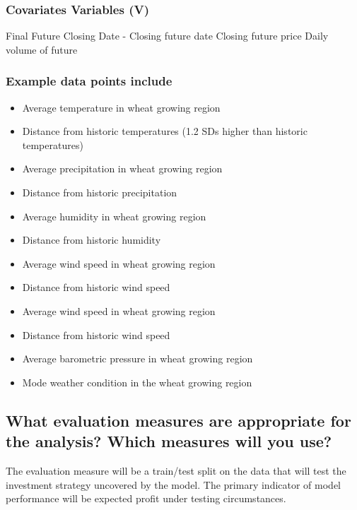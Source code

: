 \documentclass[twoside,11pt]{article}
\begin{document}
\subsubsection{Covariates Variables (V)}

Final Future Closing Date - Closing future date
Closing future price
Daily volume of future

\subsubsection{Example data points include}
\begin{itemize}
  \item Average temperature in wheat growing region 
  \item Distance from historic temperatures (1.2 SDs higher than historic temperatures)
  \\
  \item Average precipitation in wheat growing region
  \item Distance from historic precipitation
  \\
  \item Average humidity in wheat growing region
  \item Distance from historic humidity
  \\
  \item Average wind speed in wheat growing region
  \item Distance from historic wind speed
  \\
  \item Average wind speed in wheat growing region
  \item Distance from historic wind speed
  \\
  \item Average barometric pressure in wheat growing region
  \item Mode weather condition in the wheat growing region
\end{itemize}


\subsection{What evaluation measures are appropriate for the analysis? Which measures will you use?}

The evaluation measure will be a train/test split on the data that will test the investment strategy uncovered by the model. The primary indicator of model performance will be expected profit under testing circumstances.
\end{document}
